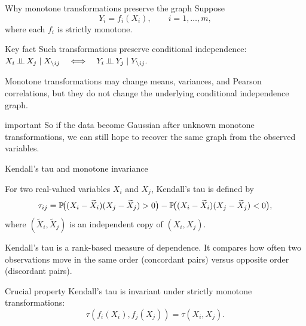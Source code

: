 \documentclass[dvipsnames,aspectratio=169,handout]{beamer}
\begin{document}
\begin{frame}{Why monotone transformations preserve the graph}
Suppose
\[
Y_i=f_i(X_i), \qquad i=1,\ldots,m,
\]
where each $f_i$ is strictly monotone.

\begin{alertblock}{Key fact}
Such transformations preserve conditional independence:\\[3mm]
\qquad\qquad\qquad\qquad\qquad\qquad$
X_i\indep X_j\mid X_{\setminus ij}
\quad\Longleftrightarrow\quad
Y_i\indep Y_j\mid Y_{\setminus ij}.
$
\end{alertblock}
\begin{block}{}
Monotone transformations may change means, variances, and Pearson correlations,
but they do not change the underlying conditional independence graph.
\end{block}

\begin{beamercolorbox}[wd=\textwidth,sep=7pt,center,rounded=true,shadow=true]{important}
So if the data become Gaussian after unknown monotone transformations,
we can still hope to recover the same graph from the observed variables.
\end{beamercolorbox}
\end{frame}


\begin{frame}{Kendall's tau and monotone invariance}

For two real-valued variables $X_i$ and $X_j$, Kendall's tau is defined by
\[
\tau_{ij}
=
\P\!\big((X_i-\widetilde X_i)(X_j-\widetilde X_j)>0\big)
-
\P\!\big((X_i-\widetilde X_i)(X_j-\widetilde X_j)<0\big),
\]
where $(\widetilde X_i,\widetilde X_j)$ is an independent copy of $(X_i,X_j)$.

\begin{block}{}
Kendall's tau is a rank-based measure of dependence.
It compares how often two observations move in the same order
(concordant pairs) versus opposite order (discordant pairs).
\end{block}

\begin{alertblock}{Crucial property}
Kendall's tau is invariant under strictly monotone transformations:
\[
\tau(f_i(X_i),f_j(X_j))=\tau(X_i,X_j).
\]
\end{alertblock}
\end{frame}
\end{document}
